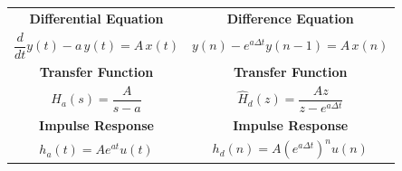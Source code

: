 \documentclass{article}
\begin{document}
\begin{enumerate}
\begin{table}[h]
\begin{tabular}{|c|c|}
\textbf{Differential Equation} &
\textbf{Difference Equation} \\

$\dfrac{d}{dt}y(t) - a\,y(t) = A\,x(t)$
&
$y(n) - e^{a\Delta t} y(n-1) = A\,x(n)$
\\ \hline

\textbf{Transfer Function} &
\textbf{Transfer Function} \\

$H_a(s) = \dfrac{A}{s-a}$
&
$\hat{H}_d(z) = \dfrac{A z}{z - e^{a\Delta t}}$
\\ \hline

\textbf{Impulse Response} &
\textbf{Impulse Response} \\

$h_a(t) = A e^{at} u(t)$
&
$h_d(n) = A \left(e^{a\Delta t}\right)^n u(n)$
\\ \hline

\end{tabular}
\end{table}
\end{enumerate}
\end{document}
